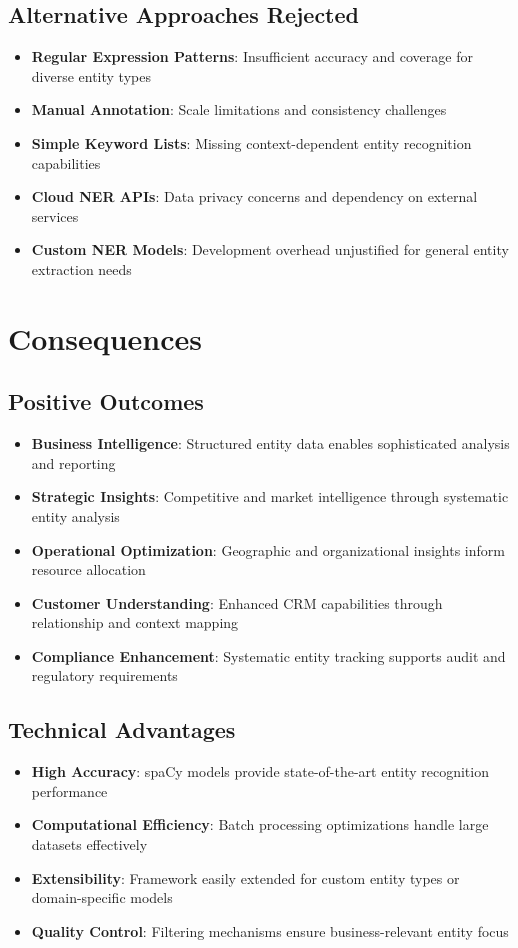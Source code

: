 \documentclass[11pt]{article}
\begin{document}
\subsection{Alternative Approaches Rejected}
\begin{itemize}
\item \textbf{Regular Expression Patterns}: Insufficient accuracy and coverage for diverse entity types
\item \textbf{Manual Annotation}: Scale limitations and consistency challenges
\item \textbf{Simple Keyword Lists}: Missing context-dependent entity recognition capabilities
\item \textbf{Cloud NER APIs}: Data privacy concerns and dependency on external services
\item \textbf{Custom NER Models}: Development overhead unjustified for general entity extraction needs
\end{itemize}

\section{Consequences}

\subsection{Positive Outcomes}
\begin{itemize}
\item \textbf{Business Intelligence}: Structured entity data enables sophisticated analysis and reporting
\item \textbf{Strategic Insights}: Competitive and market intelligence through systematic entity analysis
\item \textbf{Operational Optimization}: Geographic and organizational insights inform resource allocation
\item \textbf{Customer Understanding}: Enhanced CRM capabilities through relationship and context mapping
\item \textbf{Compliance Enhancement}: Systematic entity tracking supports audit and regulatory requirements
\end{itemize}

\subsection{Technical Advantages}
\begin{itemize}
\item \textbf{High Accuracy}: spaCy models provide state-of-the-art entity recognition performance
\item \textbf{Computational Efficiency}: Batch processing optimizations handle large datasets effectively
\item \textbf{Extensibility}: Framework easily extended for custom entity types or domain-specific models
\item \textbf{Quality Control}: Filtering mechanisms ensure business-relevant entity focus
\end{itemize}
\end{document}
